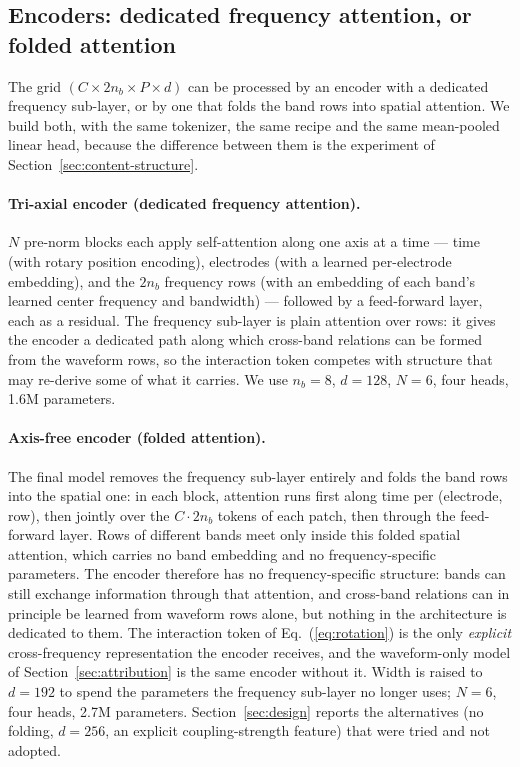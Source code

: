 \subsection{Encoders: dedicated frequency attention, or folded attention}
\label{sec:encoder}

The grid $(C \times 2n_b \times P \times d)$ can be processed by an encoder
with a dedicated frequency sub-layer, or by one that folds the band rows into
spatial attention. We build both, with the same tokenizer, the same recipe and the same
mean-pooled linear head, because the difference between them is the
experiment of Section~\ref{sec:content-structure}.

\paragraph{Tri-axial encoder (dedicated frequency attention).}
$N$ pre-norm blocks each apply self-attention along one axis at a time ---
time (with rotary position encoding), electrodes (with a learned
per-electrode embedding), and the $2n_b$ frequency rows (with an embedding
of each band's learned center frequency and bandwidth) --- followed by a
feed-forward layer, each as a residual. The frequency sub-layer is plain
attention over rows: it gives the encoder a dedicated path along which
cross-band relations can be formed from the waveform rows, so the
interaction token competes with structure that may re-derive some of what
it carries. We use
$n_b{=}8$, $d{=}128$, $N{=}6$, four heads, 1.6M parameters.

\paragraph{Axis-free encoder (folded attention).}
The final model removes the frequency sub-layer entirely and folds the band
rows into the spatial one: in each block, attention runs first along time
per (electrode, row), then jointly over the $C \cdot 2n_b$ tokens of each
patch, then through the feed-forward layer. Rows of different bands meet
only inside this folded spatial attention, which carries no band
embedding and no frequency-specific parameters. The encoder therefore has
no frequency-specific structure: bands can still exchange information
through that attention, and cross-band relations can in principle be
learned from waveform rows alone, but nothing in the architecture is
dedicated to them. The interaction token of Eq.~(\ref{eq:rotation}) is
the only \emph{explicit} cross-frequency representation the encoder
receives, and the waveform-only model of Section~\ref{sec:attribution}
is the same encoder without it. Width is raised
to $d{=}192$ to spend the parameters the frequency sub-layer no longer
uses; $N{=}6$, four heads, 2.7M parameters. Section~\ref{sec:design}
reports the alternatives (no folding, $d{=}256$, an explicit
coupling-strength feature) that were tried and not adopted.

